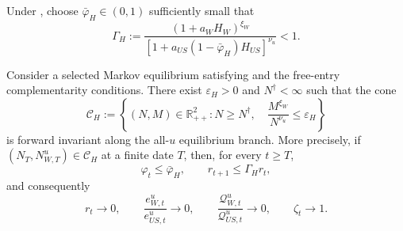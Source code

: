 \documentclass{article}
\def\green#1{#1}%
\begin{document}
Under , choose $\bar\varphi_H\in(0,1)$ sufficiently small that
\begin{equation}\label{Gamma_H_def}
\Gamma_H
:=
\frac{(1+a_WH_W)^{\xi_W}}
{[1+a_{US}(1-\bar\varphi_H)H_{US}]^{\nu_u}}
<1.
\end{equation}

\begin{prop}\label{prop_hkt_cone_invariance}
Consider a selected Markov equilibrium satisfying  \green{and the free-entry complementarity conditions}.  There exist $\varepsilon_H>0$ and $N^\dagger<\infty$ such that the cone
\begin{equation}\label{HKT_cone_def}
\mathcal C_H
:=
\left\{
(N,M)\in\mathbb R_{++}^2:
N\ge N^\dagger,
\quad
\frac{M^{\xi_W}}{N^{\nu_u}}\le\varepsilon_H
\right\}
\end{equation}
is forward invariant along the all-$u$ equilibrium branch.  More precisely, if $(N_T,N_{W,T}^u)\in\mathcal C_H$ at a finite date $T$, then, for every $t\ge T$,
\begin{equation}\label{cone_phi_bound}
\varphi_t\le\bar\varphi_H,
\qquad
r_{t+1}\le\Gamma_Hr_t,
\end{equation}
and consequently
\begin{equation}\label{cone_tail_limits}
r_t\to0,
\qquad
\frac{e_{W,t}^u}{e_{US,t}^u}\to0,
\qquad
\frac{\mathcal Q_{W,t}^u}{\mathcal Q_{US,t}^u}\to0,
\qquad
\zeta_t\to1.
\end{equation}
\end{prop}
\end{document}
